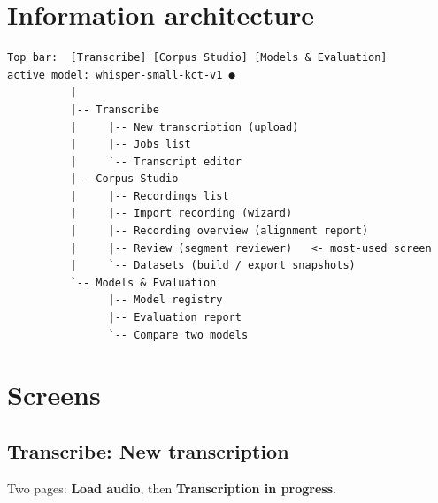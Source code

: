 \documentclass[11pt]{article}
\begin{document}
\hypertarget{information-architecture}{%
\section{Information architecture}\label{information-architecture}}

\begin{lstlisting}
Top bar:  [Transcribe] [Corpus Studio] [Models & Evaluation]      active model: whisper-small-kct-v1 ●
          |
          |-- Transcribe
          |     |-- New transcription (upload)
          |     |-- Jobs list
          |     `-- Transcript editor
          |-- Corpus Studio
          |     |-- Recordings list
          |     |-- Import recording (wizard)
          |     |-- Recording overview (alignment report)
          |     |-- Review (segment reviewer)   <- most-used screen
          |     `-- Datasets (build / export snapshots)
          `-- Models & Evaluation
                |-- Model registry
                |-- Evaluation report
                `-- Compare two models
\end{lstlisting}

\hypertarget{screens}{%
\section{Screens}\label{screens}}

\hypertarget{transcribe-new-transcription}{%
\subsection{Transcribe: New transcription}\label{transcribe-new-transcription}}

Two pages: \textbf{Load audio}, then \textbf{Transcription in progress}.
\end{document}
